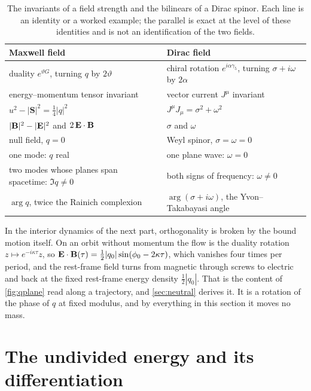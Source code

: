 \begin{table}[t]
\centering
\small
\begin{tabular}{@{}ll@{}}
\toprule
Maxwell field & Dirac field\\
\midrule
duality $e^{\vartheta G}$, turning $q$ by $2\vartheta$ & chiral rotation $e^{i\alpha\gamma_5}$, turning $\sigma+i\omega$ by $2\alpha$\\
energy--momentum tensor invariant & vector current $J^\mu$ invariant\\
$u^2-|\mathbf S|^2=\tfrac14|q|^2$ & $J^\mu J_\mu=\sigma^2+\omega^2$\\
$|\mathbf B|^2-|\mathbf E|^2$ and $2\,\mathbf E\cdot\mathbf B$ & $\sigma$ and $\omega$\\
null field, $q=0$ & Weyl spinor, $\sigma=\omega=0$\\
one mode: $q$ real & one plane wave: $\omega=0$\\
two modes whose planes span spacetime: $\Im q\neq0$ & both signs of frequency: $\omega\neq0$\\
$\arg q$, twice the Rainich complexion & $\arg(\sigma+i\omega)$, the Yvon--Takabayasi angle\\
\bottomrule
\end{tabular}
\caption{The invariants of a field strength and the bilinears of a Dirac spinor. Each line is an identity or a worked example; the
parallel is exact at the level of these identities and is not an identification of the two fields.}
\label{tab:diracmaxwell}
\end{table}

In the interior dynamics of the next part, orthogonality is broken by the bound motion itself. On an orbit without momentum the flow
is the duality rotation $z\mapsto e^{-i\kappa\tau}z$, so $\mathbf E\cdot\mathbf B(\tau)=\tfrac12|q_0|\sin(\phi_0-2\kappa\tau)$, which vanishes four times per
period, and the rest-frame field turns from magnetic through screws to electric and back at the fixed rest-frame energy density
$\tfrac12|q_0|$. That is the content of \cref{fig:qplane} read along a trajectory, and \cref{sec:neutral} derives it. It is a rotation of
the phase of $q$ at fixed modulus, and by everything in this section it moves no mass.



\section{The undivided energy and its differentiation}
\label{sec:energy}

